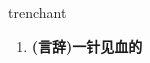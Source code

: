 
\begin{frame}
{\huge trenchant}
\begin{center}
\begin{enumerate}\Large
  \item \textbf{(言辞)一针见血的}
\end{enumerate}
\end{center}
\end{frame}
